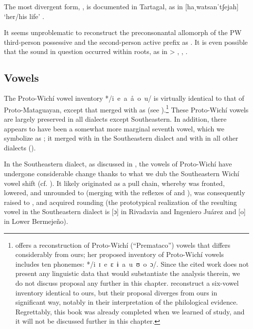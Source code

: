 The most divergent form, , is documented in Tartagal, as in [haˌwatsanˈtʃejah] `her/his life' \citep[131]{VU74}.

It seems unproblematic to reconstruct the preconsonantal allomorph of the PW third-person possessive and the second-person active prefix as . It is even possible that the sound in question occurred within roots, as in  >  \citep[48]{VN14},  \citep[54]{RL16},  \citep[220]{KC16}.

\subsection{Vowels}

The Proto-Wichí vowel inventory */i~e~a~å~o~u/ is virtually identical to that of Proto-Mataguayan, except that  merged with  as  (see ).\footnote{\citet[129–130]{EN71} offers a reconstruction of Proto-Wichí (``Premataco'') vowels that differs considerably from ours; her proposed inventory of Proto-Wichí vowels includes ten phonemes: */i~ɪ~e~ɛ~ɨ~a~u~ʊ~o~ɔ/. Since the cited work does not present any linguistic data that would substantiate the analysis therein, we do not discuss  proposal any further in this chapter. \citet{VN-NA-23} reconstruct a six-vowel inventory identical to ours, but their proposal diverges from ours in significant way, notably in their interpretation of the philological evidence. Regrettably, this book was already completed when we learned of  study, and it will not be discussed further in this chapter.} These Proto-Wichí vowels are largely preserved in all dialects except Southeastern. In addition, there appears to have been a somewhat more marginal seventh vowel, which we symbolize as ; it merged with  in the Southeastern dialect and with  in all other dialects ().

In the Southeastern dialect, as discussed in , the vowels of Proto-Wichí have undergone considerable change thanks to what we dub the Southeastern Wichí vowel shift (cf. ). It likely originated as a pull chain, whereby  was fronted, lowered, and unrounded to  (merging with the reflexes of  and ),  was consequently raised to , and  acquired rounding (the prototypical realization of the resulting vowel in the Southeastern dialect is [ɔ] in Rivadavia and Ingeniero Juárez and [o] in Lower Bermejeño).

